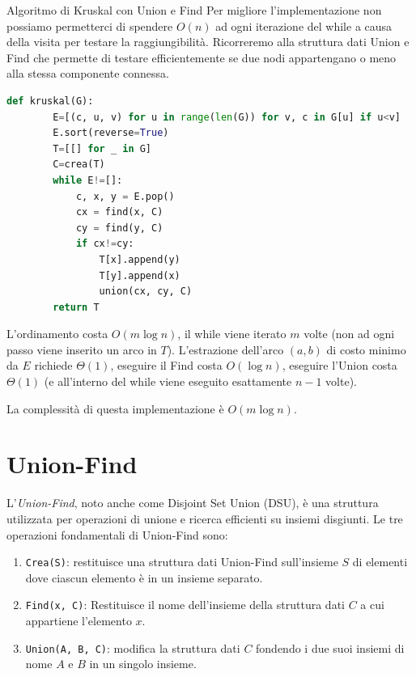 \begin{Algoritmo}{Algoritmo di Kruskal con Union e Find}{}
    Per migliore l'implementazione non possiamo permetterci di spendere $O(n)$ ad ogni iterazione del while a causa della visita per testare la raggiungibilità. Ricorreremo alla struttura dati Union e Find che permette di testare efficientemente se due nodi appartengano o meno alla stessa componente connessa.

    \begin{lstlisting}[language=Python]
    def kruskal(G):
        E=[(c, u, v) for u in range(len(G)) for v, c in G[u] if u<v]
        E.sort(reverse=True)
        T=[[] for _ in G]
        C=crea(T)
        while E!=[]:
            c, x, y = E.pop()
            cx = find(x, C)
            cy = find(y, C)
            if cx!=cy:
                T[x].append(y)
                T[y].append(x)
                union(cx, cy, C)
        return T
    \end{lstlisting}

    L’ordinamento costa $O(m \log n)$, il while viene iterato $m$ volte (non ad ogni passo viene inserito un arco in $T$). L’estrazione dell’arco $(a, b)$ di costo minimo da $E$ richiede $\Theta(1)$, eseguire il Find costa $O(\log n)$, eseguire l’Union costa $\Theta(1)$ (e all’interno del while viene eseguito esattamente $n-1$ volte).
    
    La complessità di questa implementazione è $O(m \log n)$.
\end{Algoritmo}


\section{Union-Find}
L'\textit{Union-Find}, noto anche come Disjoint Set Union (DSU), è una struttura utilizzata per operazioni di unione e ricerca efficienti su insiemi disgiunti. Le tre operazioni fondamentali di Union-Find sono:
\begin{enumerate}
    \item \verb|Crea(S)|: restituisce una struttura dati Union-Find sull’insieme $S$ di elementi dove ciascun elemento è in un insieme separato. 
    \item \verb|Find(x, C)|: Restituisce il nome dell'insieme della struttura dati $C$ a cui appartiene l’elemento $x$.
    \item \verb|Union(A, B, C)|: modifica la struttura dati $C$ fondendo i due suoi insiemi di nome $A$ e $B$ in un singolo insieme.
\end{enumerate}

